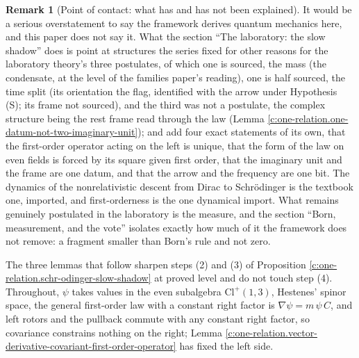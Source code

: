 \documentclass[11pt]{article}
\theoremstyle{definition}
\newtheorem{remark}[theorem]{Remark}
\theoremstyle{plain}
\providecommand{\Cl}{}\renewcommand{\Cl}{\mathrm{Cl}}
\begin{document}
\begin{remark}[Point of contact: what has and has not been explained]\label{c:note.one-relation.point-contact-what-has-has-not}
It would be a serious overstatement to say the framework derives quantum mechanics here, and this paper does not say it. What the section ``The laboratory: the slow shadow'' does is point at structures the series fixed for other reasons for the laboratory theory's three postulates, of which one is sourced, the mass (the condensate, at the level of the families paper's reading), one is half sourced, the time split (its orientation the flag, identified with the arrow under Hypothesis (S); its frame not sourced), and the third was not a postulate, the complex structure being the rest frame read through the law (Lemma \ref{c:one-relation.one-datum-not-two-imaginary-unit}); and add four exact statements of its own, that the first-order operator acting on the left is unique, that the form of the law on even fields is forced by its square given first order, that the imaginary unit and the frame are one datum, and that the arrow and the frequency are one bit. The dynamics of the nonrelativistic descent from Dirac to Schr\"odinger is the textbook one, imported, and first-orderness is the one dynamical import. What remains genuinely postulated in the laboratory is the measure, and the section ``Born, measurement, and the vote'' isolates exactly how much of it the framework does not remove: a fragment smaller than Born's rule and not zero.
\end{remark}

\label{c:note.one-relation.setting-laboratory-slow-shadow-2}
The three lemmas that follow sharpen steps (2) and (3) of Proposition \ref{c:one-relation.schr-odinger-slow-shadow} at proved level and do not touch step (4). Throughout, $\psi$ takes values in the even subalgebra $\Cl^{+}(1,3)$, Hestenes' spinor space, the general first-order law with a constant right factor is $\nabla\psi = m\,\psi\,C$, and left rotors and the pullback commute with any constant right factor, so covariance constrains nothing on the right; Lemma \ref{c:one-relation.vector-derivative-covariant-first-order-operator} has fixed the left side.
\end{document}
